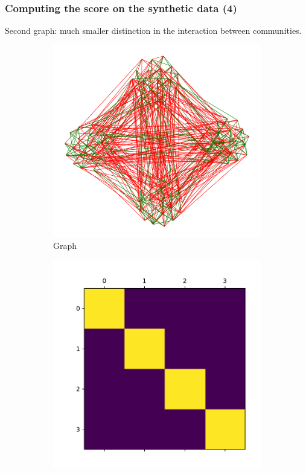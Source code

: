 \documentclass{beamer}
\begin{document}
\begin{frame}[c]
	\frametitle{Computing the score on the synthetic data (4)}
	Second graph: much smaller distinction in the interaction between
	communities.

	\begin{figure}
		\begin{center}
			\begin{subfigure}[b]{0.3\textwidth}
				\centering
				\includegraphics[width=\textwidth]{out/synthetic/model2_graph1.pdf}
				\caption{Graph}
				\label{fig:}
			\end{subfigure}
			\begin{subfigure}[b]{0.3\textwidth}
				\centering
				\includegraphics[width=\textwidth]{out/synthetic/model2_omega_positive2.pdf}

\end{subfigure}
\end{center}
\end{figure}
\end{frame}
\end{document}
